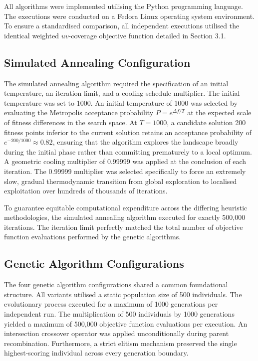 \documentclass[conference]{IEEEtran}
\begin{document}
All algorithms were implemented utilising the Python programming language. The executions were conducted on a Fedora Linux operating system environment. To ensure a standardised comparison, all independent executions utilised the identical weighted $uv$-coverage objective function detailed in Section 3.1. 

\subsection{Simulated Annealing Configuration}
The simulated annealing algorithm required the specification of an initial temperature, an iteration limit, and a cooling schedule multiplier. The initial temperature was set to 1000. An initial temperature of 1000 was selected by evaluating the Metropolis acceptance probability $P = e^{\Delta f / T}$ at the expected scale of fitness differences in the search space. At $T = 1000$, a candidate solution 200 fitness points inferior to the current solution retains an acceptance probability of $e^{-200/1000} \approx 0.82$, ensuring that the algorithm explores the landscape broadly during the initial phase rather than committing prematurely to a local optimum. A geometric cooling multiplier of 0.99999 was applied at the conclusion of each iteration. The 0.99999 multiplier was selected specifically to force an extremely slow, gradual thermodynamic transition from global exploration to localised exploitation over hundreds of thousands of iterations. 

To guarantee equitable computational expenditure across the differing heuristic methodologies, the simulated annealing algorithm executed for exactly 500,000 iterations. The iteration limit perfectly matched the total number of objective function evaluations performed by the genetic algorithms.

\subsection{Genetic Algorithm Configurations}
The four genetic algorithm configurations shared a common foundational structure. 
All variants utilised a static population size of 500 individuals. The evolutionary 
process executed for a maximum of 1000 generations per independent run. The multiplication 
of 500 individuals by 1000 generations yielded a maximum of 500,000 objective function 
evaluations per execution. An intersection crossover operator was applied unconditionally 
during parent recombination. Furthermore, a strict elitism mechanism preserved the single 
highest-scoring individual across every generation boundary.
\end{document}
